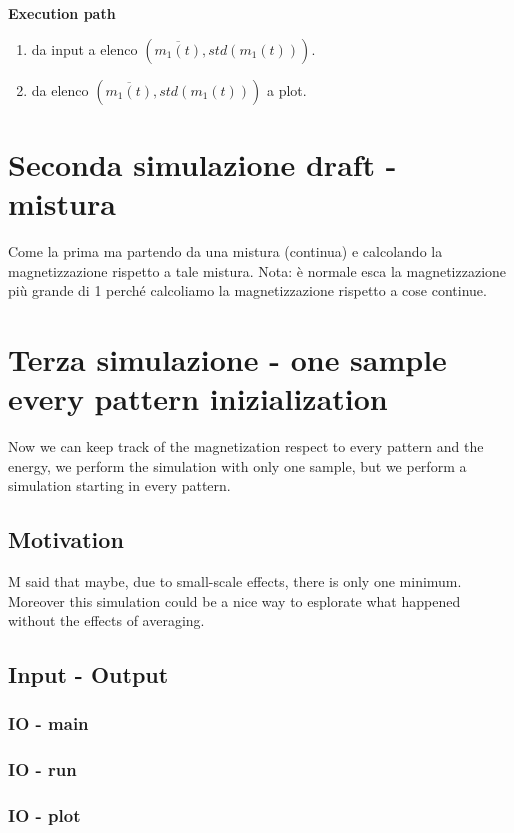 \documentclass[a4paper,10pt]{article}
\begin{document}
\textbf{Execution path}
\begin{enumerate}
 \item da input a elenco $(\overline{m_1(t)}, std(m_1(t)))$.
 \item da elenco $(\overline{m_1(t)}, std(m_1(t)))$ a plot.
\end{enumerate}

\section{Seconda simulazione draft - mistura}

Come la prima ma partendo da una mistura (continua) e calcolando la magnetizzazione rispetto a tale mistura.
Nota: è normale esca la magnetizzazione più grande di 1 perché calcoliamo la magnetizzazione rispetto a cose continue.

\section{Terza simulazione - one sample every pattern inizialization}

Now we can keep track of the magnetization respect to every pattern and the energy, we perform the simulation with only one sample, but we perform a simulation starting in every pattern.

\subsection{Motivation}

M said that maybe, due to small-scale effects, there is only one minimum. Moreover this simulation could be a nice way to esplorate what happened without the effects of averaging.

\subsection{Input - Output}

\subsubsection{IO - main}


\subsubsection{IO - run}


\subsubsection{IO - plot}


\printbibliography
\end{document}
